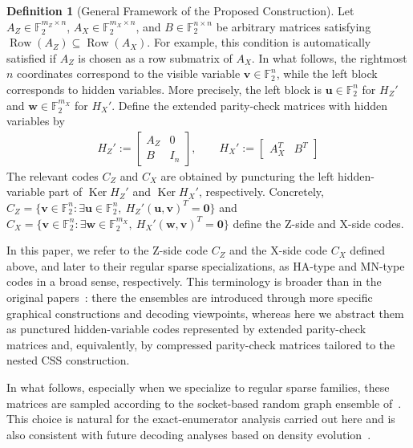 \documentclass[11pt]{article}
\theoremstyle{definition}
\newtheorem{definition}[theorem]{Definition}
\newcommand{\F}{\mathbb F}
\newcommand{\Row}{\operatorname{Row}}
\newcommand{\Ker}{\operatorname{Ker}}
\newcommand{\bu}{\mathbf u}
\newcommand{\bv}{\mathbf v}
\newcommand{\bw}{\mathbf w}
\newcommand{\zeros}{\mathbf 0}
\newcommand{\CZ}{C_Z}
\newcommand{\CX}{C_X}
\begin{document}
\begin{definition}[General Framework of the Proposed Construction]\label{def:framework-jp}
Let \(A_Z\in\F_2^{m_Z\times n}\), \(A_X\in\F_2^{m_X\times n}\), and \(B\in\F_2^{n\times n}\) be arbitrary matrices satisfying \(\Row(A_Z)\subseteq \Row(A_X)\).
For example, this condition is automatically satisfied if \(A_Z\) is chosen as a row submatrix of \(A_X\).
In what follows, the rightmost \(n\) coordinates correspond to the visible variable \(\bv\in\F_2^n\), while the left block corresponds to hidden variables. More precisely, the left block is \(\bu\in\F_2^n\) for \(H_Z'\) and \(\bw\in\F_2^{m_X}\) for \(H_X'\).
Define the extended parity-check matrices with hidden variables by
\begin{equation*}
\begin{aligned}
H_Z'
:=
\begin{bmatrix}
A_Z & 0\\
B   & I_n
\end{bmatrix},
\qquad
H_X'
:=
\begin{bmatrix}
A_X^T & B^T
\end{bmatrix}
\end{aligned}
\end{equation*}
The relevant codes \(\CZ\) and \(\CX\) are obtained by puncturing the left hidden-variable part of \(\Ker H_Z'\) and \(\Ker H_X'\), respectively. Concretely,
\(\CZ=\{\bv\in\F_2^n:\exists \bu\in\F_2^n,\ H_Z'(\bu,\bv)^T=\zeros\}\)
and
\(\CX=\{\bv\in\F_2^n:\exists \bw\in\F_2^{m_X},\ H_X'(\bw,\bv)^T=\zeros\}\)
define the Z-side and X-side codes.
\end{definition}

In this paper, we refer to the Z-side code \(\CZ\) and the X-side code \(\CX\) defined above, and later to their regular sparse specializations, as HA-type and MN-type codes in a broad sense, respectively. This terminology is broader than in the original papers~\cite{MN96,HA05}: there the ensembles are introduced through more specific graphical constructions and decoding viewpoints, whereas here we abstract them as punctured hidden-variable codes represented by extended parity-check matrices and, equivalently, by compressed parity-check matrices tailored to the nested CSS construction.

In what follows, especially when we specialize to regular sparse families, these matrices are sampled according to the socket-based random graph ensemble of~\cite[Secs.~3.3--3.4]{RU08}. This choice is natural for the exact-enumerator analysis carried out here and is also consistent with future decoding analyses based on density evolution~\cite[Sec.~3.9 and App.~B]{RU08}.
\end{document}
